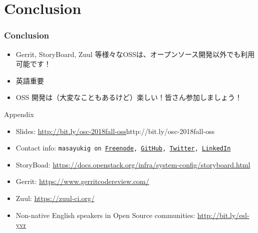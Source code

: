 \documentclass[aspectratio=169,11pt,hyperref={colorlinks=true}]{beamer}
\begin{document}
\section{Conclusion}
\begin{frame}
  \frametitle{Conclusion}
  \begin{itemize}
    \item Gerrit, StoryBoard, Zuul 等様々なOSSは、オープンソース開発以外でも利用可能です！
    \item 英語重要
    \item OSS 開発は（大変なこともあるけど）楽しい！皆さん参加しましょう！
  \end{itemize}
  Appendix
  \begin{itemize}
      \item Slides: \url{http://bit.ly/osc-2018fall-oss}{http://bit.ly/osc-2018fall-oss}
      \item Contact info: \texttt{masayukig on
        \href{https://freenode.net/}{Freenode},
        \href{https://github.com/masayukig}{GitHub},
        \href{https://twitter.com/masayukig}{Twitter},
        \href{https://www.linkedin.com/in/masayukig/}{LinkedIn}}
      \item StoryBoad: \url{https://docs.openstack.org/infra/system-config/storyboard.html}
      \item Gerrit: \url{https://www.gerritcodereview.com/}
      \item Zuul: \url{https://zuul-ci.org/}
      \item Non-native English speakers in Open Source communities: \url{http://bit.ly/esl-yvr}
  \end{itemize}
\end{frame}
\end{document}

